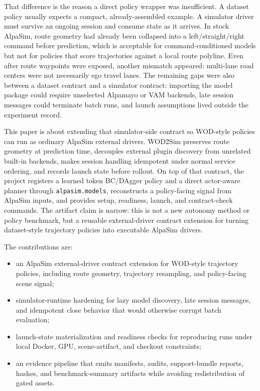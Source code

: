 \documentclass{article}
\begin{document}
That difference is the reason a direct policy wrapper was insufficient. A dataset policy
usually expects a compact, already-assembled example. A simulator driver must survive an
ongoing session and consume state as it arrives. In stock AlpaSim, route geometry had
already been collapsed into a left/straight/right command before prediction, which is
acceptable for command-conditioned models but not for policies that score trajectories
against a local route polyline. Even after route waypoints were exposed, another mismatch
appeared: multi-lane road centers were not necessarily ego travel lanes. The remaining
gaps were also between a dataset contract and a simulator contract: importing the model
package could require unselected Alpamayo or VAM backends, late session messages could
terminate batch runs, and launch assumptions lived outside the experiment record.

This paper is about extending that simulator-side contract so WOD-style policies can run
as ordinary AlpaSim external drivers. WOD2Sim preserves route geometry at
prediction time, decouples external plugin discovery from unrelated built-in backends,
makes session handling idempotent under normal service ordering, and records launch state
before rollout. On top of that contract, the project registers a learned token
BC/DAgger policy and a direct actor-aware planner through
\texttt{alpasim.models}, reconstructs a policy-facing signal from AlpaSim inputs, and
provides setup, readiness, launch, and contract-check commands. The artifact claim is
narrow: this is not a new autonomy method or policy benchmark, but a reusable
external-driver contract extension for turning dataset-style trajectory policies into
executable AlpaSim drivers.

The contributions are:
\begin{itemize}
\item an AlpaSim external-driver contract extension for WOD-style trajectory policies,
including route geometry, trajectory resampling, and policy-facing scene signal;
\item simulator-runtime hardening for lazy model discovery, late session messages, and
idempotent close behavior that would otherwise corrupt batch evaluation;
\item launch-state materialization and readiness checks for reproducing runs under local
Docker, GPU, scene-artifact, and checkout constraints;
\item an evidence pipeline that emits manifests, audits, support-bundle reports, hashes,
and benchmark-summary artifacts while avoiding redistribution of gated assets.
\end{itemize}
\end{document}
